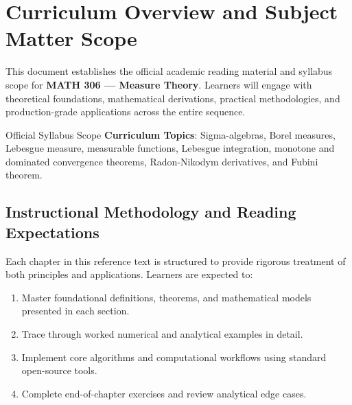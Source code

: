 \section{Curriculum Overview and Subject Matter Scope}

This document establishes the official academic reading material and syllabus scope for \textbf{MATH 306 --- Measure Theory}. Learners will engage with theoretical foundations, mathematical derivations, practical methodologies, and production-grade applications across the entire sequence.

\begin{InsightBox}{Official Syllabus Scope}
  \textbf{Curriculum Topics}: Sigma-algebras, Borel measures, Lebesgue measure, measurable functions, Lebesgue integration, monotone and dominated convergence theorems, Radon-Nikodym derivatives, and Fubini theorem.
\end{InsightBox}

\subsection{Instructional Methodology and Reading Expectations}

Each chapter in this reference text is structured to provide rigorous treatment of both principles and applications. Learners are expected to:
\begin{enumerate}
  \item Master foundational definitions, theorems, and mathematical models presented in each section.
  \item Trace through worked numerical and analytical examples in detail.
  \item Implement core algorithms and computational workflows using standard open-source tools.
  \item Complete end-of-chapter exercises and review analytical edge cases.
\end{enumerate}

